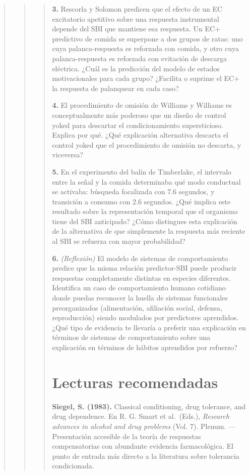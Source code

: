 \documentclass[
  letterpaper,
  DIV=11,
  numbers=noendperiod]{scrreprt}
\begin{document}
\begin{tcolorbox}[enhanced jigsaw, arc=.35mm, bottomrule=.15mm, breakable, colback=white, colframe=quarto-callout-note-color-frame, left=2mm, leftrule=.75mm, opacityback=0, rightrule=.15mm, toprule=.15mm]
\begin{quote}
\begin{quote}
\begin{quote}
\textbf{3.} Rescorla y Solomon predicen que el efecto de un EC
excitatorio apetitivo sobre una respuesta instrumental depende del SBI
que mantiene esa respuesta. Un EC+ predictivo de comida se superpone a
dos grupos de ratas: uno cuya palanca-respuesta es reforzada con comida,
y otro cuya palanca-respuesta es reforzada con evitación de descarga
eléctrica. ¿Cuál es la predicción del modelo de estados motivacionales
para cada grupo? ¿Facilita o suprime el EC+ la respuesta de palanquear
en cada caso?

\textbf{4.} El procedimiento de omisión de Williams y Williams es
conceptualmente más poderoso que un diseño de control yoked para
descartar el condicionamiento supersticioso. Explica por qué. ¿Qué
explicación alternativa descarta el control yoked que el procedimiento
de omisión no descarta, y viceversa?

\textbf{5.} En el experimento del balín de Timberlake, el intervalo
entre la señal y la comida determinaba qué modo conductual se activaba:
búsqueda focalizada con 7.6 segundos, y transición a consumo con 2.6
segundos. ¿Qué implica este resultado sobre la representación temporal
que el organismo tiene del SBI anticipado? ¿Cómo distingues esta
explicación de la alternativa de que simplemente la respuesta más
reciente al SBI se refuerza con mayor probabilidad?

\textbf{6.} \emph{(Reflexión)} El modelo de sistemas de comportamiento
predice que la misma relación predictor-SBI puede producir respuestas
completamente distintas en especies diferentes. Identifica un caso de
comportamiento humano cotidiano donde puedas reconocer la huella de
sistemas funcionales preorganizados (alimentación, afiliación social,
defensa, reproducción) siendo modulados por predictores aprendidos. ¿Qué
tipo de evidencia te llevaría a preferir una explicación en términos de
sistemas de comportamiento sobre una explicación en términos de hábitos
aprendidos por refuerzo?

\mbox{}%
\section{Lecturas recomendadas}\label{lecturas-recomendadas-4}

\textbf{Siegel, S. (1983).} Classical conditioning, drug tolerance, and
drug dependence. En R. G. Smart et al.~(Eds.), \emph{Research advances
in alcohol and drug problems} (Vol. 7). Plenum. --- Presentación
accesible de la teoría de respuestas compensatorias con abundante
evidencia farmacológica. El punto de entrada más directo a la literatura
sobre tolerancia condicionada.


\end{quote}
\end{quote}
\end{quote}
\end{tcolorbox}
\end{document}
